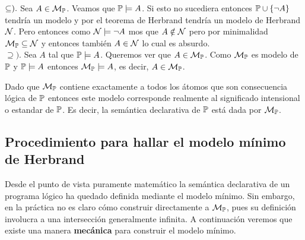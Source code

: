\documentclass[11pt,letterpaper]{article}
\begin{document}
\proof
$\inc).$ Sea $A\in\M_\P$. Veamos que $\P\models A$. Si esto no sucediera 
entonces $\P\cup\{\neg A\}$ tendr\'ia un modelo y por el teorema de Herbrand 
tendr\'ia un modelo de Herbrand $\Nc$. Pero entonces como $\Nc\models\neg A$ 
mos que $A\notin\Nc$ pero por minimalidad  $\M_\P\inc\Nc$ y entonces 
tambi\'en $A\in\Nc$ lo cual es absurdo.\\
$\supseteq).$ Sea $A$ tal que $\P\models A$. Queremos ver que $A\in\M_\P$. Como 
$\M_\P$ es modelo de $\P$ y $\P\models A$ entonces $\M_\P\models A$, es decir, 
$A\in\M_\P$.

\medskip

Dado que $\M_\P$ contiene exactamente a todos los \'atomos que son 
consecuencia
l\'ogica de $\P$ entonces este modelo corresponde realmente al significado
intensional o estandar de $\P$. Es decir, la sem\'antica declarativa de $\P$ 
est\'a dada por $\M_\P$.


\subsection{Procedimiento para hallar el modelo m\'inimo de Herbrand}

Desde el punto de vista puramente matem\'atico la sem\'antica declarativa de un
programa l\'ogico ha quedado definida mediante el modelo m\'inimo. Sin embargo, 
en la pr\'actica no es claro c\'omo construir directamente a $\M_\P$, pues su
definici\'on involucra a una intersecci\'on generalmente infinita. A 
continuaci\'on veremos que existe una manera \textbf{mec\'anica} para construir 
el modelo m\'inimo.

\end{document}

